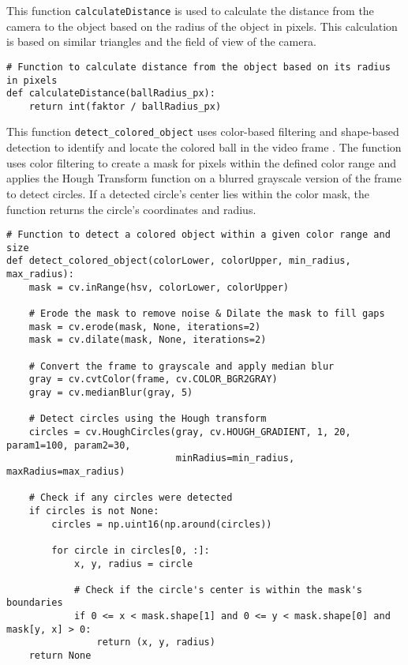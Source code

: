 This function \verb|calculateDistance| is used to calculate the distance from the camera to the object based on the radius of the object in pixels. This calculation is based on similar triangles and the field of view of the camera.
\begin{lstlisting}[language=PythonPlus]
# Function to calculate distance from the object based on its radius in pixels
def calculateDistance(ballRadius_px):
    return int(faktor / ballRadius_px)
\end{lstlisting}

This function \verb|detect_colored_object| uses color-based filtering and shape-based detection to identify and locate the colored ball in the video frame \cite{ColoredObject}. The function uses color filtering to create a mask for pixels within the defined color range and applies the Hough Transform function \cite{OpenCVHoughCircle} on a blurred grayscale version of the frame to detect circles. If a detected circle's center lies within the color mask, the function returns the circle's coordinates and radius\cite{CircleDetection}.
\begin{lstlisting}[language=PythonPlus]
# Function to detect a colored object within a given color range and size
def detect_colored_object(colorLower, colorUpper, min_radius, max_radius):
    mask = cv.inRange(hsv, colorLower, colorUpper)
    
    # Erode the mask to remove noise & Dilate the mask to fill gaps
    mask = cv.erode(mask, None, iterations=2)
    mask = cv.dilate(mask, None, iterations=2)
    
    # Convert the frame to grayscale and apply median blur
    gray = cv.cvtColor(frame, cv.COLOR_BGR2GRAY)
    gray = cv.medianBlur(gray, 5)

    # Detect circles using the Hough transform
    circles = cv.HoughCircles(gray, cv.HOUGH_GRADIENT, 1, 20, param1=100, param2=30,
                              minRadius=min_radius, maxRadius=max_radius)

    # Check if any circles were detected
    if circles is not None:
        circles = np.uint16(np.around(circles))

        for circle in circles[0, :]:
            x, y, radius = circle

            # Check if the circle's center is within the mask's boundaries
            if 0 <= x < mask.shape[1] and 0 <= y < mask.shape[0] and mask[y, x] > 0:
                return (x, y, radius)
    return None
\end{lstlisting}

